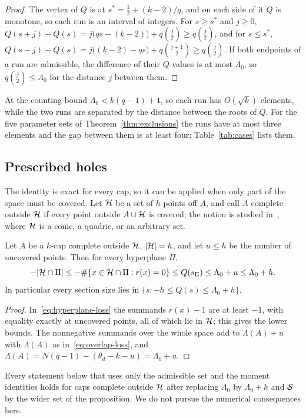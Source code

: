 \begin{proof}
The vertex of \(Q\) is at \(s^*=\tfrac12+(k-2)/q\), and on each side of
it \(Q\) is monotone, so each run is an interval of integers.  For
\(s\ge s^*\) and \(j\ge0\),
\(Q(s+j)-Q(s)=j\bigl(qs-(k-2)\bigr)+q\binom{j}{2}\ge q\binom{j}{2}\),
and for \(s\le s^*\),
\(Q(s-j)-Q(s)=j\bigl((k-2)-qs\bigr)+q\binom{j+1}{2}\ge q\binom{j}{2}\).
If both endpoints of a run are admissible, the difference of their
\(Q\)-values is at most \(\Lambda_0\), so \(q\binom{j}{2}\le\Lambda_0\)
for the distance \(j\) between them.
\end{proof}

At the counting bound \(\Lambda_0<k(q-1)+1\), so each run has
\(O(\sqrt k)\) elements, while the two runs are separated by the distance
between the roots of \(Q\).  For the five parameter sets of
Theorem~\ref{thm:exclusions} the runs have at most three elements and the
gap between them is at least four; Table~\ref{tab:cases} lists them.

\subsection{Prescribed holes}

The identity is exact for every cap, so it can be applied when only part
of the space must be covered.  Let \(\mathcal H\) be a set of \(h\) points off
\(A\), and call \(A\) complete outside \(\mathcal H\) if every point outside
\(A\cup\mathcal H\) is covered; the notion is studied
in~\cite{RuddSecantDefects}, where \(\mathcal H\) is a conic, a quadric, or an
arbitrary set.

\begin{proposition}
\label{prop:holes}
Let \(A\) be a \(k\)-cap complete outside \(\mathcal H\), \(|\mathcal H|=h\), and let
\(u\le h\) be the number of uncovered points.  Then for every hyperplane
\(\Pi\),
\[
 -|\mathcal H\cap\Pi|\le -\#\{x\in\mathcal H\cap\Pi:r(x)=0\}\le Q(s_\Pi)\le\Lambda_0+u\le\Lambda_0+h .
\]
In particular every section size lies in
\(\{s:-h\le Q(s)\le\Lambda_0+h\}\).
\end{proposition}

\begin{proof}
In~\eqref{eq:hyperplane-loss} the summands \(r(x)-1\) are at least
\(-1\), with equality exactly at uncovered points, all of which lie in
\(\mathcal H\); this gives the lower bounds.  The nonnegative summands over the
whole space add to \(\Lambda(A)+u\) with \(\Lambda(A)\) as
in~\eqref{eq:overlap-loss}, and \(\Lambda(A)=N(q-1)-(\theta_d-k-u)=\Lambda_0+u\).
\end{proof}

Every statement below that uses only the admissible set and the moment
identities holds for caps complete outside \(\mathcal H\) after replacing
\(\Lambda_0\) by \(\Lambda_0+h\) and \(\mathcal S\) by the wider set of the
proposition.  We do not pursue the numerical consequences here.
